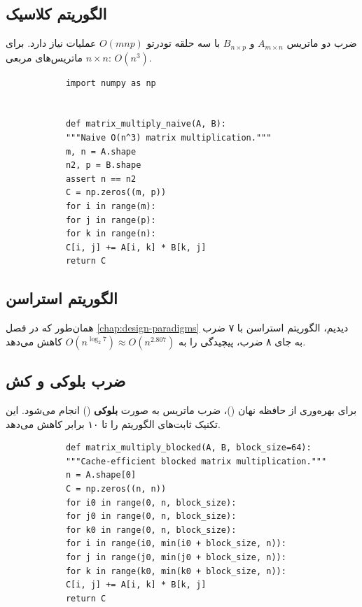 \documentclass{matinbook}
\begin{document}
    \subsection{الگوریتم کلاسیک}
    
    ضرب دو ماتریس $A_{m \times n}$ و $B_{n \times p}$
    با سه حلقه تودرتو $O(mnp)$ عملیات نیاز دارد.
    برای ماتریس‌های مربعی $n \times n$:
    $O(n^{3})$.
    
    \begin{latin}
        \begin{verbatim}
            import numpy as np
            
            
            def matrix_multiply_naive(A, B):
            """Naive O(n^3) matrix multiplication."""
            m, n = A.shape
            n2, p = B.shape
            assert n == n2
            C = np.zeros((m, p))
            for i in range(m):
            for j in range(p):
            for k in range(n):
            C[i, j] += A[i, k] * B[k, j]
            return C
        \end{verbatim}
    \end{latin}
    \label{code:naive-mult}
    
    \subsection{الگوریتم استراسن}
    
    همان‌طور که در فصل \ref{chap:design-paradigms} دیدیم،
    الگوریتم استراسن
    با ۷ ضرب به جای ۸ ضرب،
    پیچیدگی را به $O(n^{\log_{2}7}) \approx O(n^{2.807})$
    کاهش می‌دهد.
    
    \subsection{ضرب بلوکی و کش}
    
    برای بهره‌وری از حافظه نهان ()،
    ضرب ماتریس به صورت \textbf{بلوکی}
    () انجام می‌شود.
    این تکنیک ثابت‌های الگوریتم را
    تا ۱۰ برابر کاهش می‌دهد.
    
    \begin{latin}
        \begin{verbatim}
            def matrix_multiply_blocked(A, B, block_size=64):
            """Cache-efficient blocked matrix multiplication."""
            n = A.shape[0]
            C = np.zeros((n, n))
            for i0 in range(0, n, block_size):
            for j0 in range(0, n, block_size):
            for k0 in range(0, n, block_size):
            for i in range(i0, min(i0 + block_size, n)):
            for j in range(j0, min(j0 + block_size, n)):
            for k in range(k0, min(k0 + block_size, n)):
            C[i, j] += A[i, k] * B[k, j]
            return C
        \end{verbatim}
    \end{latin}
    \label{code:blocked-mult}
    
\end{document}
